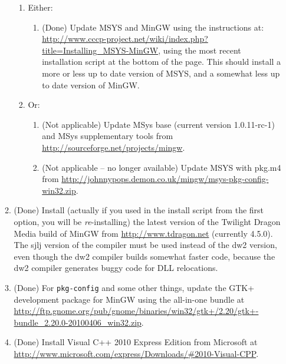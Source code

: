 \documentclass[11pt,letterpaper,onecolumn]{scrartcl}
\begin{document}
\begin{sloppypar}
\begin{enumerate}
\begin{enumerate}
\begin{enumerate}
					\item Either:
						\begin{enumerate}
							\item (Done) Update MSYS and MinGW using the instructions at: \url{http://www.cccp-project.net/wiki/index.php?title=Installing_MSYS-MinGW}, using the most recent installation script at the bottom of the page. This should install a more or less up to date version of MSYS, and a somewhat less up to date version of MinGW.
						\end{enumerate}
					\item Or:
						\begin{enumerate}
							\item (Not applicable) Update MSys base (current version 1.0.11-rc-1) and MSys supplementary tools from \url{http://sourceforge.net/projects/mingw}. 
							\item (Not applicable -- no longer available) Update MSYS with pkg.m4 from \url{http://johnnypops.demon.co.uk/mingw/msys-pkg-config-win32.zip}. 
			  		\end{enumerate}
					\end{enumerate}
				\item (Done) Install (actually if you used in the install script from the first option, you will be \emph{re}-installing) the latest version of the Twilight Dragon Media build of MinGW from \url{http://www.tdragon.net} (currently 4.5.0). The sjlj version of the compiler must be used instead of the dw2 version, even though the dw2 compiler builds somewhat faster code, because the dw2 compiler generates buggy code for DLL relocations.
				\item (Done) For \texttt{pkg-config} and some other things, update the GTK+ development package for MinGW using the all-in-one bundle at \url{http://ftp.gnome.org/pub/gnome/binaries/win32/gtk+/2.20/gtk+-bundle_2.20.0-20100406_win32.zip}.
				\item (Done) Install Visual C++ 2010 Express Edition from Microsoft at \url{http://www.microsoft.com/express/Downloads/#2010-Visual-CPP}.		
		

\end{enumerate}
\end{enumerate}
\end{sloppypar}
\end{document}
